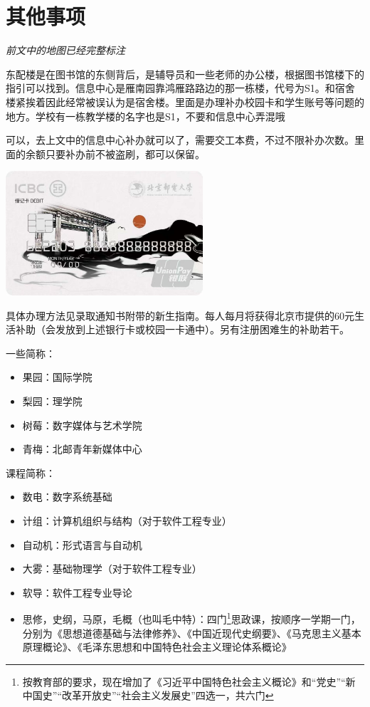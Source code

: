 \section{其他事项}


\emph{前文中的地图已经完整标注}

东配楼是在图书馆的东侧背后，是辅导员和一些老师的办公楼，根据图书馆楼下的指引可以找到。信息中心是雁南园靠鸿雁路路边的那一栋楼，代号为S1。和宿舍楼紧挨着因此经常被误认为是宿舍楼。里面是办理补办校园卡和学生账号等问题的地方。学校有一栋教学楼的名字也是S1，不要和信息中心弄混哦~


可以，去上文中的信息中心补办就可以了，需要交工本费，不过不限补办次数。里面的余额只要补办前不被盗刷，都可以保留。


\begin{center}
    \includegraphics[width=0.55\textwidth]{images/card.jpg}
\end{center}

具体办理方法见录取通知书附带的新生指南。每人每月将获得北京市提供的60元生活补助（会发放到上述银行卡或校园一卡通中）。另有注册困难生的补助若干。


一些简称：
\begin{itemize}
    \item 果园：国际学院
    \item 梨园：理学院
    \item 树莓：数字媒体与艺术学院
    \item 青梅：北邮青年新媒体中心
\end{itemize}

课程简称：
\begin{itemize}
    \item 数电：数字系统基础
    \item 计组：计算机组织与结构（对于软件工程专业）
    \item 自动机：形式语言与自动机
    \item 大雾：基础物理学（对于软件工程专业）
    \item 软导：软件工程专业导论
    \item 思修，史纲，马原，毛概（也叫毛中特）：四门\footnote{按教育部的要求，现在增加了《习近平中国特色社会主义概论》和“党史”“新中国史”“改革开放史”“社会主义发展史”四选一，共六门}思政课，按顺序一学期一门，分别为《思想道德基础与法律修养》、《中国近现代史纲要》、《马克思主义基本原理概论》、《毛泽东思想和中国特色社会主义理论体系概论》
\end{itemize}
